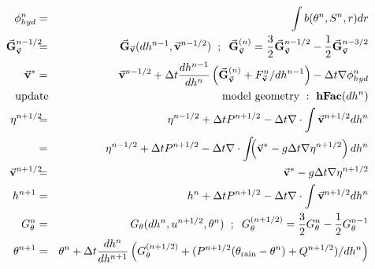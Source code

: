 \begin{eqnarray}
\phi^{n}_{hyd} & = & \int b(\theta^{n},S^{n},r) dr
\label{eq:phi-hyd-nlfs} \\
\vec{\bf G}_{\vec{\bf v}}^{n-1/2}\hspace{-2mm} & = & 
\vec{\bf G}_{\vec{\bf v}} (dh^{n-1},\vec{\bf v}^{n-1/2})
\hspace{+2mm};\hspace{+2mm}
\vec{\bf G}_{\vec{\bf v}}^{(n)} =  
   \frac{3}{2} \vec{\bf G}_{\vec{\bf v}}^{n-1/2} 
-  \frac{1}{2} \vec{\bf G}_{\vec{\bf v}}^{n-3/2}
\label{eq:Gv-n-nlfs} \\
\vec{\bf v}^{*} & = & \vec{\bf v}^{n-1/2} + \Delta t \frac{dh^{n-1}}{dh^{n}} \left(
\vec{\bf G}_{\vec{\bf v}}^{(n)} + F_{\vec{\bf v}}^{n}/dh^{n-1} \right)
- \Delta t \nabla \phi_{hyd}^{n}
\label{eq:vstar-nlfs} \\
  \mathrm{update}\hspace{-4mm} & & \hspace{-4mm}\mathrm{
  model~geometry~:~{\bf hFac}}(dh^n)\nonumber \\
\eta^{n+1/2} \hspace{-2mm} & = & 
\eta^{n-1/2} + \Delta t P^{n+1/2} - \Delta t
  \nabla \cdot \int \vec{\bf v}^{n+1/2} dh^{n} \nonumber \\
             & = & \eta^{n-1/2} + \Delta t P^{n+1/2} - \Delta t
  \nabla \cdot \int \!\!\! \left( \vec{\bf v}^* - g \Delta t \nabla \eta^{n+1/2} \right) dh^{n}
\label{eq:nstar-nlfs} \\
\vec{\bf v}^{n+1/2}\hspace{-2mm} & = & 
\vec{\bf v}^{*} - g \Delta t \nabla \eta^{n+1/2}
\label{eq:v-n+1-nlfs} \\
h^{n+1} & = & h^{n} + \Delta t P^{n+1/2} - \Delta t
  \nabla \cdot \int \vec{\bf v}^{n+1/2} dh^{n}
\label{eq:h-n+1-nlfs} \\
G_{\theta}^{n} & = & G_{\theta} ( dh^{n}, u^{n+1/2}, \theta^{n} )
\hspace{+2mm};\hspace{+2mm}
G_{\theta}^{(n+1/2)} = \frac{3}{2} G_{\theta}^{n} - \frac{1}{2} G_{\theta}^{n-1}
\label{eq:Gt-n-nlfs} \\
\theta^{n+1} & = &\theta^{n} + \Delta t \frac{dh^n}{dh^{n+1}} \left( 
G_{\theta}^{(n+1/2)}
+( P^{n+1/2} (\theta_{\mathrm{rain}}-\theta^n) + Q^{n+1/2})/dh^n \right)
\nonumber \\
& & \label{eq:t-n+1-nlfs}
\end{eqnarray}
